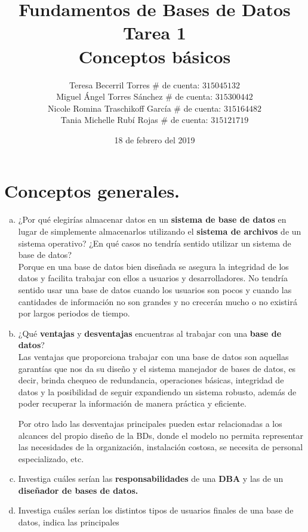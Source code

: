 \documentclass[letterpaper,12pt]{article}
\title{Fundamentos de Bases de Datos \\
        Tarea 1 \\
        Conceptos básicos}
\author{Teresa Becerril Torres
            $\#$ de cuenta: $315045132$ \\
            Miguel Ángel Torres Sánchez
            $\#$ de cuenta: $315300442$ \\
            Nicole Romina Traschikoff García
            $\#$ de cuenta: $315164482$ \\
            Tania Michelle Rubí Rojas
            $\#$ de cuenta: $315121719$}
\date{18 de febrero del 2019}
\begin{document}
    \maketitle

    \section{Conceptos generales.}
          \begin{enumerate}[a. ]

            \item ¿Por qué elegirías almacenar datos en un \textbf{sistema de base de datos} en lugar de simplemente almacenarlos utilizando el \textbf{sistema de archivos} de un sistema operativo? ¿En qué casos no tendría sentido utilizar un sistema de base de datos? \\

          Porque en una base de datos bien diseñada se asegura la integridad de los datos y facilita trabajar con ellos a usuarios y desarrolladores. No tendría sentido usar una base de datos cuando los usuarios son pocos y cuando las cantidades de información no son grandes y no crecerán mucho o no existirá por largos periodos de tiempo.

            \item ¿Qué \textbf{ventajas} y \textbf{desventajas} encuentras al trabajar con una \textbf{base de datos}?\\

            Las ventajas que proporciona trabajar con una base de datos son aquellas garantías que nos da su diseño y el sistema manejador de bases de datos, es decir, brinda chequeo de redundancia, operaciones básicas, integridad de datos y la posibilidad de seguir expandiendo un sistema robusto, además de poder recuperar la información de manera práctica y eficiente.

            Por otro lado las desventajas principales pueden estar relacionadas a los alcances del propio diseño de la BDs, donde el modelo no permita representar las necesidades de la organización, instalación costosa, se necesita de personal especializado, etc.


            \item Investiga cuáles serían las \textbf{responsabilidades} de una \textbf{DBA} y las de un \textbf{diseñador de bases de datos.}

            \item Investiga cuáles serían los distintos tipos de usuarios finales de una base de datos, indica las principales \\


\end{enumerate}
\end{document}

